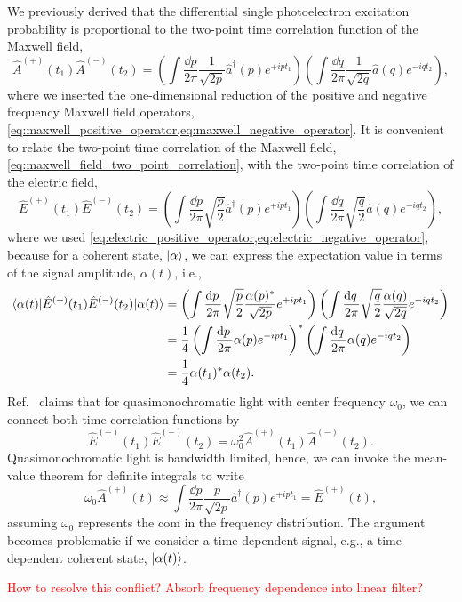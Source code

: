We previously derived that the differential single photoelectron excitation probability is proportional to the two-point time correlation function of the Maxwell field,
\begin{equation}
	\hat{A}^{(+)}(t_1)
	\hat{A}^{(-)}(t_2)
	=
	\left(
		\int\frac{\dd{p}}{2\pi}
		\frac{1}{\sqrt{2p}}
		\hat{a}^\dagger(p)
		e^{+ipt_1}
	\right)
	\left(
		\int\frac{\dd{q}}{2\pi}
		\frac{1}{\sqrt{2q}}
		\hat{a}(q)
		e^{-iqt_2}
	\right)
	,
	\label{eq:maxwell_field_two_point_correlation}
\end{equation}
where we inserted the one-dimensional reduction of the positive and negative frequency Maxwell field operators, \cref{eq:maxwell_positive_operator,eq:maxwell_negative_operator}.
It is convenient to relate the two-point time correlation of the Maxwell field, \cref{eq:maxwell_field_two_point_correlation}, with the two-point time correlation of the electric field,
\begin{equation}
	\hat{E}^{(+)}(t_1)
	\hat{E}^{(-)}(t_2)
	=
	\left(
		\int\frac{\dd{p}}{2\pi}
		\sqrt{\frac{p}{2}}
		\hat{a}^\dagger(p)
		e^{+ipt_1}
	\right)
	\left(
		\int\frac{\dd{q}}{2\pi}
		\sqrt{\frac{q}{2}}
		\hat{a}(q)
		e^{-iqt_2}
	\right)
	,
	\label{eq:electric_field_two_point_correlation}
\end{equation}
where we used \cref{eq:electric_positive_operator,eq:electric_negative_operator}, because for a coherent state, $\lvert\alpha\rangle$, we can express the expectation value in terms of the signal amplitude, $\alpha(t)$, i.e.,
\begin{equation}
	\begin{split}
		\bra{\alpha(t)}
		\hat{E}^{(+)}(t_1)
		\hat{E}^{(-)}(t_2)
		\ket{\alpha(t)}
		&=
		\left(
			\int\frac{\dd{p}}{2\pi}
			\sqrt{\frac{p}{2}}
			\frac{\alpha(p)^*}{\sqrt{2p}}
			e^{+ipt_1}
		\right)
		\left(
			\int\frac{\dd{q}}{2\pi}
			\sqrt{\frac{q}{2}}
			\frac{\alpha(q)}{\sqrt{2q}}
			e^{-iqt_2}
		\right)
		\\
		&=
		\frac{1}{4}
		\left(
			\int\frac{\dd{p}}{2\pi}
			\alpha(p)
			e^{-ipt_1}
		\right)^*
		\left(
			\int\frac{\dd{q}}{2\pi}
			\alpha(q)
			e^{-iqt_2}
		\right)
		\\
		&=
		\frac{1}{4}
		\alpha(t_1)^*
		\alpha(t_2)
		.
	\end{split}
\end{equation}
Ref.~\cite{Kimble1984} claims that for quasimonochromatic light with center frequency $\omega_0$, we can connect both time-correlation functions by
\begin{equation}
	\hat{E}^{(+)}(t_1)
	\hat{E}^{(-)}(t_2)
	=
	\omega_0^2
	\hat{A}^{(+)}(t_1)
	\hat{A}^{(-)}(t_2)
	.
\end{equation}
Quasimonochromatic light is bandwidth limited, hence, we can invoke the mean-value theorem for definite integrals to write
\begin{equation}
	\omega_0
	\hat{A}^{(+)}(t)
	\approx
	\int\frac{\dd{p}}{2\pi}
	\frac{p}{\sqrt{2p}}
	\hat{a}^\dagger(p)
	e^{+ipt_1}
	=
	\hat{E}^{(+)}(t)
	,
\end{equation}
assuming $\omega_0$ represents the \gls{com} in the frequency distribution.
The argument becomes problematic if we consider a time-dependent signal, e.g., a time-dependent coherent state, $\lvert\alpha(t)\rangle$.

\textcolor{red}{How to resolve this conflict? Absorb frequency dependence into linear filter?}